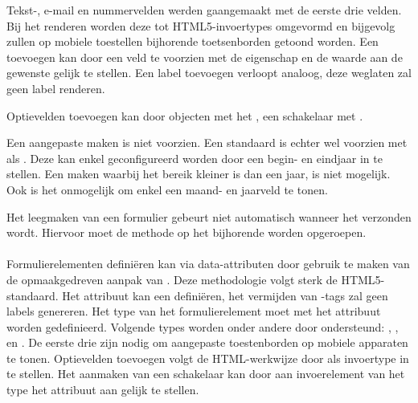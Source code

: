 Tekst-, e-mail en nummervelden werden gaangemaakt met de eerste drie velden.
Bij het renderen worden deze tot HTML5-invoertypes omgevormd en bijgevolg zullen op mobiele toestellen bijhorende toetsenborden getoond worden.
Een  toevoegen kan door een veld te voorzien met de eigenschap  en de waarde aan de gewenste  gelijk te stellen. 
Een label toevoegen verloopt analoog,  deze weglaten zal geen label renderen.

Optievelden toevoegen kan door objecten met het  ,  een schakelaar met  .

Een aangepaste  maken is niet voorzien.
Een standaard  is echter wel voorzien met  als .
Deze kan enkel geconfigureerd worden door een begin- en eindjaar in te stellen.
Een  maken waarbij het bereik kleiner is dan een jaar, is niet mogelijk.
Ook is het onmogelijk om enkel een maand- en jaarveld te tonen.

Het leegmaken van een formulier gebeurt niet automatisch wanneer het verzonden wordt.
Hiervoor moet de  methode op het bijhorende  worden opgeroepen.

\paragraph{\kendo}
 Formulierelementen definiëren kan via data-attributen door gebruik te maken van de opmaakgedreven aanpak van \kendo.
 Deze methodologie volgt sterk de HTML5-standaard.
 Het attribuut kan een  definiëren,  het vermijden van -tags zal geen labels genereren.
 Het type van het formulierelement moet met het  attribuut worden gedefinieerd.
 Volgende types worden onder andere door \kendo{} ondersteund:  , ,  en .
 De eerste drie zijn nodig om aangepaste toestenborden op mobiele apparaten te tonen.
%  
 Optievelden toevoegen volgt de HTML-werkwijze door  als invoertype in te stellen.
 Het aanmaken van een schakelaar kan door aan invoerelement van het type  het  attribuut aan  gelijk te stellen.

